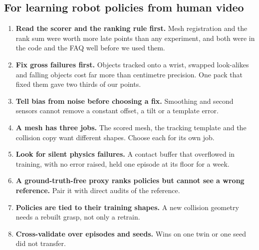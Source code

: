 \documentclass[11pt]{article}
\begin{document}
\subsection{For learning robot policies from human video}
\begin{enumerate}[itemsep=2pt,topsep=3pt]
\item \textbf{Read the scorer and the ranking rule first.} Mesh registration and the rank sum were worth more late points than any experiment, and both were in the code and the FAQ well before we used them.
\item \textbf{Fix gross failures first.} Objects tracked onto a wrist, swapped look-alikes and falling objects cost far more than centimetre precision. One pack that fixed them gave two thirds of our points.
\item \textbf{Tell bias from noise before choosing a fix.} Smoothing and second sensors cannot remove a constant offset, a tilt or a template error.
\item \textbf{A mesh has three jobs.} The scored mesh, the tracking template and the collision copy want different shapes. Choose each for its own job.
\item \textbf{Look for silent physics failures.} A contact buffer that overflowed in training, with no error raised, held one episode at its floor for a week.
\item \textbf{A ground-truth-free proxy ranks policies but cannot see a wrong reference.} Pair it with direct audits of the reference.
\item \textbf{Policies are tied to their training shapes.} A new collision geometry needs a rebuilt grasp, not only a retrain.
\item \textbf{Cross-validate over episodes and seeds.} Wins on one twin or one seed did not transfer.
\end{enumerate}
\end{document}
